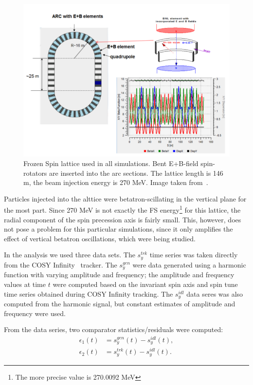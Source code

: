 \documentclass[]{elsarticle}
\begin{document}
\begin{figure}[h]
  \includegraphics[width=\linewidth]{img/BNL_lattice}
  \caption{Frozen Spin lattice used in all simulations. Bent E+B-field spin-rotators are inserted
    into the arc sections. The lattice length is 146 m,
    the beam injection energy is 270 MeV. Image taken from~\cite{Senichev:Lattices}.\label{fig:BNL_lattice}}
\end{figure}


Particles injected into the alttice were betatron-scillating in the vertical plane for the most part.
Since 270 MeV is not exactly the FS energy\footnote{The more precise value is 270.0092 MeV}
for this lattice, the radial component of the spin precession axis is fairly small. This, however,
does not pose a problem for this particular simulations, since it only amplifies the effect of vertical
betatron oscillations, which were being studied.

In the analysis we used three data sets. The $s_y^{trk}$ time series was taken directly
from the COSY Infinity~\cite{COSYInf} tracker. The $s_y^{gen}$ were data generated using a harmonic function
with varying amplitude and frequency; the amplitude and frequency values at time $t$ were computed based
on the invariant spin axis and spin tune time series obtained during COSY Infinity tracking.
The $s_y^{idl}$ data seres was also computed from the harmonic signal, but constant estimates of
amplitude and frequency were used.

From the data series, two comparator statistics/residuals were computed:
\begin{align*}
  \epsilon_1(t) &= s_y^{gen}(t) - s_y^{idl}(t), \tag{generator residual}\\
  \epsilon_2(t) &= s_y^{trk}(t) - s_y^{idl}(t). \tag{tracker residual}
\end{align*}
\end{document}
